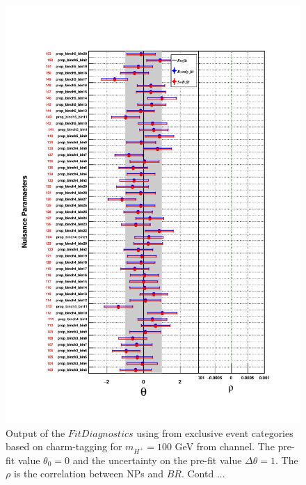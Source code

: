 \begin{figure}
\begin{center}
\includegraphics[width=1.0\textwidth]{Image/MLFit/FitDiag/fitDiag3.pdf}
 \caption{Output of the $FitDiagnostics$ using \mjj from
     exclusive event categories based on charm-tagging for $m_{H^+} = 100$
     GeV from \ljets channel. The pre-fit value $\theta_0 = 0$ and the uncertainty on the
     pre-fit value $\Delta\theta = 1$. The $\rho$ is the correlation between NPs and $BR$. Contd ...}
\label{fig:fitDiag3}
\end{center}
\end{figure}


